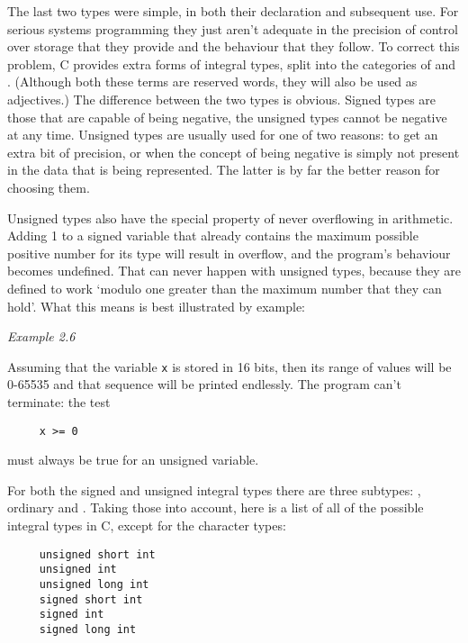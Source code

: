    The last two types were simple, in both their declaration and subsequent
    use. For serious systems programming they just aren't adequate in the
    precision of control over storage that they provide and the behaviour that
    they follow. To correct this problem, C provides extra forms of
    integral types, split into the categories of \signed{} and
    \unsigned. (Although both these terms are reserved words, they
    will also be used as adjectives.) The difference between the two types is
    obvious. Signed types are those that are capable of being negative, the
    unsigned types cannot be negative at any time. Unsigned types are usually
    used for one of two reasons: to get an extra bit of precision, or when the
    concept of being negative is simply not present in the data that is being
    represented. The latter is by far the better reason for choosing them.


   Unsigned types also have the special property of never overflowing in
    arithmetic. Adding 1 to a signed variable that already contains the
    maximum possible positive number for its type will result in overflow, and
    the program's behaviour becomes undefined. That can never happen with
    unsigned types, because they are defined to work `modulo one greater
    than the maximum number that they can hold'. What this means is best
    illustrated by example:


    \begin{center}\textit{Example 2.6}\end{center}


   Assuming that the variable \texttt{x} is stored in
    16 bits, then its range of values will be 0-65535 and that
    sequence will be printed endlessly. The program can't terminate: the
    test


   \begin{Verbatim}
     x >= 0
   \end{Verbatim}

   must always be true for an unsigned variable.


   For both the signed and unsigned integral types there are three
    subtypes: \short, ordinary and \klong. Taking those
    into account, here is a list of all of the possible integral types
    in C, except for the character types:


   \begin{Verbatim}
     unsigned short int
     unsigned int
     unsigned long int
     signed short int
     signed int
     signed long int
   \end{Verbatim}

